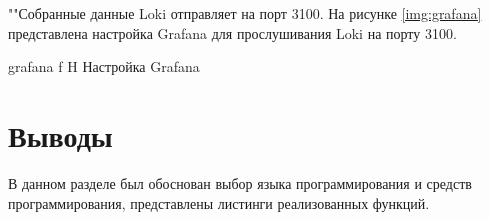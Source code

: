 
""\newline\indent Собранные данные Loki отправляет на порт 3100. На рисунке \ref{img:grafana} представлена настройка Grafana для прослушивания Loki на порту 3100.

{grafana}
{f}
{H}
{\textwidth}
{Настройка Grafana}	

\section{Выводы}

В данном разделе был обоснован выбор языка программирования и средств программирования, представлены листинги реализованных функций.